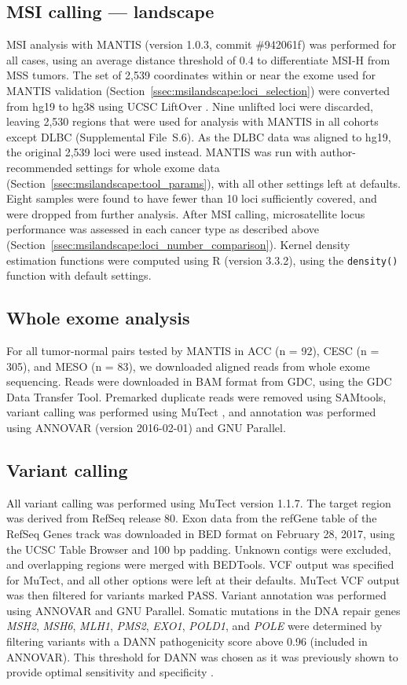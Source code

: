 \subsection{MSI calling --- landscape}
MSI analysis with MANTIS (version 1.0.3, commit \#942061f) was performed for all cases, using an average distance threshold of 0.4 to differentiate MSI-H from MSS tumors. The set of 2,539 coordinates within or near the exome used for MANTIS validation (Section~\ref{ssec:msilandscape:loci_selection}) were converted from hg19 to hg38 using UCSC LiftOver \cite{hinrichs2006}. Nine unlifted loci were discarded, leaving 2,530 regions that were used for analysis with MANTIS in all cohorts except DLBC (Supplemental File~S\thechapter{}.6). As the DLBC data was aligned to hg19, the original 2,539 loci were used instead. MANTIS was run with author-recommended settings for whole exome data (Section~\ref{ssec:msilandscape:tool_params}), with all other settings left at defaults. Eight samples were found to have fewer than 10 loci sufficiently covered, and were dropped from further analysis. After MSI calling, microsatellite locus performance was assessed in each cancer type as described above (Section~\ref{ssec:msilandscape:loci_number_comparison}). Kernel density estimation functions were computed using R (version 3.3.2), using the \texttt{density()} function with default settings.

\subsection{Whole exome analysis}
For all tumor-normal pairs tested by MANTIS in ACC (n = 92), CESC (n = 305), and MESO (n = 83), we downloaded aligned reads from whole exome sequencing. Reads were downloaded in BAM format from GDC, using the GDC Data Transfer Tool. Premarked duplicate reads were removed using SAMtools, variant calling was performed using MuTect \cite{cibulskis2013}, and annotation was performed using ANNOVAR \cite{annovar} (version 2016-02-01) and GNU Parallel.

\subsection{Variant calling}
\label{ssec:msilandscape:variant_calling}
All variant calling was performed using MuTect version 1.1.7. The target region was derived from RefSeq \cite{oleary2015} release 80. Exon data from the refGene table of the RefSeq Genes track was downloaded in BED format on February 28, 2017, using the UCSC Table Browser \cite{karolchik2004} and 100 bp padding. Unknown contigs were excluded, and overlapping regions were merged with BEDTools. VCF output was specified for MuTect, and all other options were left at their defaults. MuTect VCF output was then filtered for variants marked PASS\@. Variant annotation was performed using ANNOVAR and GNU Parallel. Somatic mutations in the DNA repair genes \textit{MSH2}, \textit{MSH6}, \textit{MLH1}, \textit{PMS2}, \textit{EXO1}, \textit{POLD1}, and \textit{POLE} were determined by filtering variants with a DANN \cite{quang2015} pathogenicity score above 0.96 (included in ANNOVAR)\@. This threshold for DANN was chosen as it was previously shown to provide optimal sensitivity and specificity \cite{jensen2015}.


